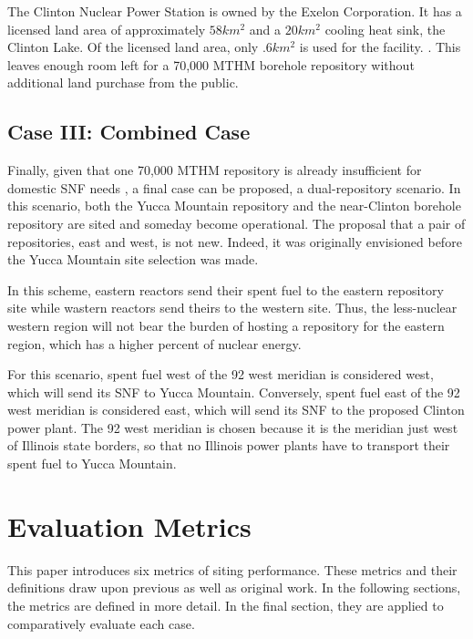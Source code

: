 The Clinton Nuclear Power Station is owned by the Exelon Corporation. It has a 
licensed land area of approximately $58km^2$ and a $20km^2$ cooling heat sink, 
the Clinton Lake. Of the licensed land area, only $.6km^2$ is used for the facility.  
\cite{nrc_chapter_2007}.  This leaves enough room left for a 70,000 \gls{MTHM} 
borehole repository without additional land purchase from the public.

\subsection{Case III: Combined Case}
Finally, given that one 70,000 MTHM repository is already insufficient for 
domestic \gls{SNF} needs \cite{doe_report_2008}, a final case can be proposed, 
a dual-repository scenario. In this scenario, both the Yucca Mountain 
repository and the near-Clinton borehole repository are sited and someday 
become operational. The proposal that a pair of repositories, east and west, is 
not new. Indeed, it was originally envisioned before the Yucca Mountain site 
selection was made.

In this scheme, eastern reactors send their spent fuel to the eastern 
repository site while wastern reactors send theirs to the western site. Thus, 
the less-nuclear western region will not bear the burden of hosting a 
repository for the eastern region, which has a higher percent of nuclear 
energy. 

For this scenario, spent fuel west of the 92 west meridian is considered west, 
which will send its \gls{SNF} to Yucca Mountain. Conversely, spent fuel east of the 92 west
meridian is considered east, which will send its \gls{SNF} to the proposed Clinton 
power plant. The 92 west meridian is chosen because it is the meridian just west of
Illinois state borders, so that no Illinois power plants have to transport their
spent fuel to Yucca Mountain. %



\section{Evaluation Metrics}

This paper introduces six metrics of siting performance. These metrics and 
their definitions draw upon previous 
\cite{freeze_siting_2015,waleed_regional_2015} as well as original work.  In 
the following sections, the metrics are defined in more detail. In the final 
section, they are applied to comparatively evaluate each case.

